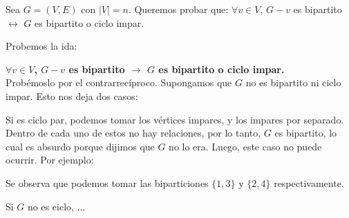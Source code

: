 \documentclass{article}
\begin{document}
Sea $G = (V,E)$ con $|V| = n$. Queremos probar que: $\forall v \in V$, $G-v$ es bipartito $\leftrightarrow$ $G$ es bipartito o ciclo impar.

Probemos la ida:

\textbf{$\forall v \in V$, $G-v$ es bipartito $\rightarrow$ $G$ es bipartito o ciclo impar.}\\

Probémoslo por el contrarrecíproco. Supongamos que $G$ no es bipartito ni ciclo impar. Esto nos deja dos casos:

Si es ciclo par, podemos tomar los vértices impares, y los impares por separado. Dentro de cada uno de estos no hay relaciones, por lo tanto, $G$ es bipartito, lo cual es absurdo porque dijimos que $G$ no lo era. Luego, este caso no puede ocurrir. Por ejemplo:

\begin{center}
\end{center}

Se observa que podemos tomar las biparticiones $\{1,3\}$ y $\{2,4\}$ respectivamente.

Si $G$ no es ciclo, ...
\end{document}
